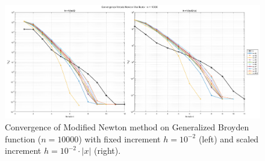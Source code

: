 \documentclass[a4paper,12pt]{article}
\begin{document}
	
	\begin{figure}[htbp]
		\centering
		\includegraphics[width=\textwidth]{../immagini/broyden_10k_h2.png}
		\caption{Convergence of Modified Newton method on Generalized Broyden function ($n=10000$) with fixed increment $h = 10^{-2}$ (left) and scaled increment $h = 10^{-2}\cdot|x|$ (right).}
		\label{fig:fd_broyden_10k_h2}
	\end{figure}
	
\end{document}
